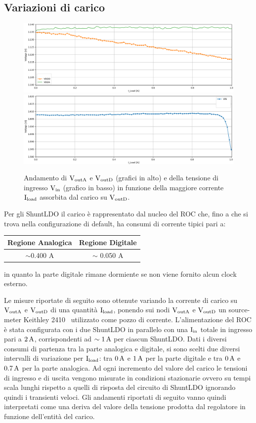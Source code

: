 \subsection{Variazioni di carico}
\label{451}
\begin{figure}
\centering
\includegraphics[width=\textwidth]{Immagini/LoadVDDD}
\includegraphics[width=\textwidth]{Immagini/LoadVIND}
\caption{Andamento di $\mathrm{V_{outA}}$ e $\mathrm{V_{outD}}$ (grafici in alto) e della tensione di ingresso $\mathrm{V_{in}}$ (grafico in basso) in funzione della maggiore corrente $\mathrm{I_{load}}$ assorbita dal carico su $\mathrm{V_{outD}}$.}
\label{LoadVDDD}
\label{LoadVIND}
\end{figure}

Per gli ShuntLDO il carico è rappresentato dal nucleo del ROC che, fino a che si trova nella configurazione di default, ha consumi di corrente tipici pari a:
\begin{center}
\begin{tabular}{cc}
\hline
Regione Analogica & Regione Digitale \\ \hline
$\sim$0.400 A & $\sim$ 0.050 A\\ \hline     
\end{tabular}
\end{center}
in quanto la parte digitale rimane dormiente se non viene fornito alcun clock esterno.

Le misure riportate di seguito sono ottenute variando la corrente di carico su $\mathrm{V_{outA}}$ e $\mathrm{V_{outD}}$ di una quantit\`a $\mathrm{I_{load}}$, ponendo sui nodi $\mathrm{V_{outA}}$ e $\mathrm{V_{outD}}$ un source-meter Keithley 2410~\cite{2410} utilizzato come pozzo di corrente. L'alimentazione del ROC \`e stata configurata con i due ShuntLDO in parallelo con una $\mathrm{I_{in}}$ totale in ingresso pari a $2\rm \, A$, corrispondenti ad $\sim 1\rm \, A$ per ciascun ShuntLDO. Dati i diversi consumi di partenza tra la parte analogica e digitale, si sono scelti due diversi intervalli di variazione per $\mathrm{I_{load}}$: tra $0\rm \, A$ e $1\rm \, A$ per la parte digitale e tra $0\rm \, A$ e $0.7\rm \, A$ per la parte analogica. Ad ogni incremento del valore del carico le tensioni di ingresso e di uscita vengono misurate in condizioni stazionarie ovvero su tempi scala lunghi rispetto a quelli di risposta del circuito di ShuntLDO ignorando quindi i transienti veloci.
Gli andamenti riportati di seguito vanno quindi interpretati come una deriva del valore della tensione prodotta dal regolatore in funzione dell'entità del carico. 

